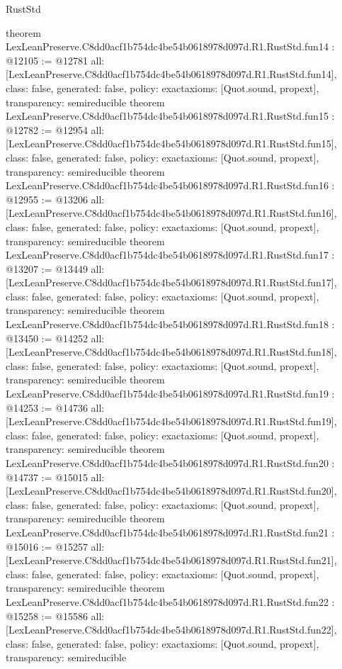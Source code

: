 \begin{lexlean}{RustStd}
\begin{coremodule}
{}
theorem LexLeanPreserve.C8dd0acf1b754dc4be54b0618978d097d.R1.RustStd.fun14 : @12105 := @12781 {
  all: [LexLeanPreserve.C8dd0acf1b754dc4be54b0618978d097d.R1.RustStd.fun14],
  class: false,
  generated: false,
  policy: exact{axioms: [Quot.sound, propext]},
  transparency: semireducible
}
theorem LexLeanPreserve.C8dd0acf1b754dc4be54b0618978d097d.R1.RustStd.fun15 : @12782 := @12954 {
  all: [LexLeanPreserve.C8dd0acf1b754dc4be54b0618978d097d.R1.RustStd.fun15],
  class: false,
  generated: false,
  policy: exact{axioms: [Quot.sound, propext]},
  transparency: semireducible
}
theorem LexLeanPreserve.C8dd0acf1b754dc4be54b0618978d097d.R1.RustStd.fun16 : @12955 := @13206 {
  all: [LexLeanPreserve.C8dd0acf1b754dc4be54b0618978d097d.R1.RustStd.fun16],
  class: false,
  generated: false,
  policy: exact{axioms: [Quot.sound, propext]},
  transparency: semireducible
}
theorem LexLeanPreserve.C8dd0acf1b754dc4be54b0618978d097d.R1.RustStd.fun17 : @13207 := @13449 {
  all: [LexLeanPreserve.C8dd0acf1b754dc4be54b0618978d097d.R1.RustStd.fun17],
  class: false,
  generated: false,
  policy: exact{axioms: [Quot.sound, propext]},
  transparency: semireducible
}
theorem LexLeanPreserve.C8dd0acf1b754dc4be54b0618978d097d.R1.RustStd.fun18 : @13450 := @14252 {
  all: [LexLeanPreserve.C8dd0acf1b754dc4be54b0618978d097d.R1.RustStd.fun18],
  class: false,
  generated: false,
  policy: exact{axioms: [Quot.sound, propext]},
  transparency: semireducible
}
theorem LexLeanPreserve.C8dd0acf1b754dc4be54b0618978d097d.R1.RustStd.fun19 : @14253 := @14736 {
  all: [LexLeanPreserve.C8dd0acf1b754dc4be54b0618978d097d.R1.RustStd.fun19],
  class: false,
  generated: false,
  policy: exact{axioms: [Quot.sound, propext]},
  transparency: semireducible
}
theorem LexLeanPreserve.C8dd0acf1b754dc4be54b0618978d097d.R1.RustStd.fun20 : @14737 := @15015 {
  all: [LexLeanPreserve.C8dd0acf1b754dc4be54b0618978d097d.R1.RustStd.fun20],
  class: false,
  generated: false,
  policy: exact{axioms: [Quot.sound, propext]},
  transparency: semireducible
}
theorem LexLeanPreserve.C8dd0acf1b754dc4be54b0618978d097d.R1.RustStd.fun21 : @15016 := @15257 {
  all: [LexLeanPreserve.C8dd0acf1b754dc4be54b0618978d097d.R1.RustStd.fun21],
  class: false,
  generated: false,
  policy: exact{axioms: [Quot.sound, propext]},
  transparency: semireducible
}
theorem LexLeanPreserve.C8dd0acf1b754dc4be54b0618978d097d.R1.RustStd.fun22 : @15258 := @15586 {
  all: [LexLeanPreserve.C8dd0acf1b754dc4be54b0618978d097d.R1.RustStd.fun22],
  class: false,
  generated: false,
  policy: exact{axioms: [Quot.sound, propext]},
  transparency: semireducible
}
\end{coremodule}
\end{lexlean}
